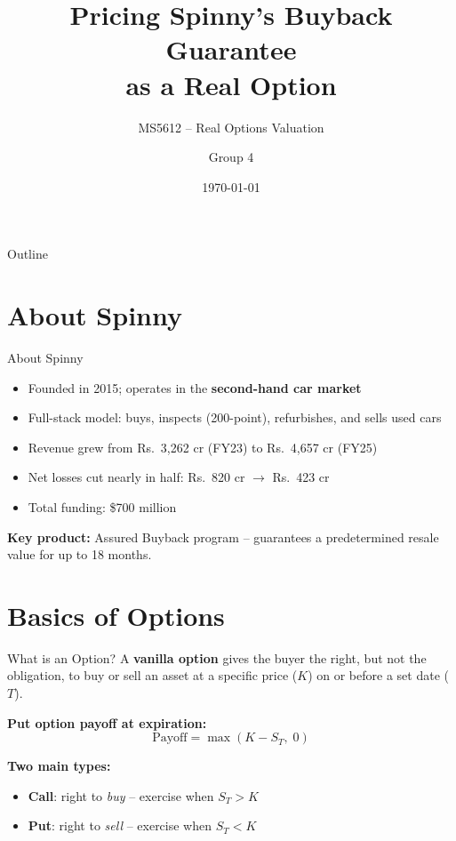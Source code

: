 \documentclass[11pt, aspectratio=43]{beamer}
\title[MS5612 Project]{Pricing Spinny's Buyback Guarantee \\ as a Real Option}
\subtitle{MS5612 -- Real Options Valuation}
\author{Group 4}
\date{\today}
\begin{document}
\begin{frame}
    \titlepage
\end{frame}


\begin{frame}{Outline}
    \tableofcontents
\end{frame}


\section{About Spinny}

\begin{frame}{About Spinny}
    \begin{itemize}
        \item Founded in 2015; operates in the \textbf{second-hand car market}
        \item Full-stack model: buys, inspects (200-point), refurbishes, and sells used cars
        \item Revenue grew from Rs.~3,262 cr (FY23) to Rs.~4,657 cr (FY25)
        \item Net losses cut nearly in half: Rs.~820 cr $\to$ Rs.~423 cr
        \item Total funding: \$700 million
    \end{itemize}

    \vspace{0.5em}
    \textbf{Key product:} Assured Buyback program -- guarantees a predetermined resale value for up to 18 months.
\end{frame}


\section{Basics of Options}

\begin{frame}{What is an Option?}
    A \textbf{vanilla option} gives the buyer the right, but not the obligation, to buy or sell an asset at a specific price ($K$) on or before a set date ($T$).

    \vspace{0.8em}
    \textbf{Put option payoff at expiration:}
    \[
        \text{Payoff} = \max(K - S_T, \; 0)
    \]

    \vspace{0.8em}
    \textbf{Two main types:}
    \begin{itemize}
        \item \textbf{Call}: right to \emph{buy} -- exercise when $S_T > K$
        \item \textbf{Put}: right to \emph{sell} -- exercise when $S_T < K$
    \end{itemize}
\end{frame}
\end{document}
